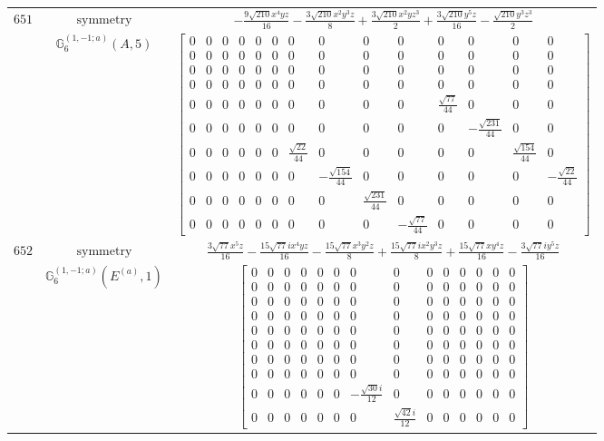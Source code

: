 \documentclass[fleqn,8pt,landscape]{jsarticle}
\begin{document}
\begin{longtable}{ccc}
$ 651 $ & $ \text{symmetry} $ & $ - \frac{9 \sqrt{210} x^{4} y z}{16} - \frac{3 \sqrt{210} x^{2} y^{3} z}{8} + \frac{3 \sqrt{210} x^{2} y z^{3}}{2} + \frac{3 \sqrt{210} y^{5} z}{16} - \frac{\sqrt{210} y^{3} z^{3}}{2} $ \\
$  $ & $ \mathbb{G}_{6}^{(1,-1;a)}(A,5) $ & $ \begin{bmatrix} 0 & 0 & 0 & 0 & 0 & 0 & 0 & 0 & 0 & 0 & 0 & 0 & 0 & 0 \\ 0 & 0 & 0 & 0 & 0 & 0 & 0 & 0 & 0 & 0 & 0 & 0 & 0 & 0 \\ 0 & 0 & 0 & 0 & 0 & 0 & 0 & 0 & 0 & 0 & 0 & 0 & 0 & 0 \\ 0 & 0 & 0 & 0 & 0 & 0 & 0 & 0 & 0 & 0 & 0 & 0 & 0 & 0 \\ 0 & 0 & 0 & 0 & 0 & 0 & 0 & 0 & 0 & 0 & \frac{\sqrt{77}}{44} & 0 & 0 & 0 \\ 0 & 0 & 0 & 0 & 0 & 0 & 0 & 0 & 0 & 0 & 0 & - \frac{\sqrt{231}}{44} & 0 & 0 \\ 0 & 0 & 0 & 0 & 0 & 0 & \frac{\sqrt{22}}{44} & 0 & 0 & 0 & 0 & 0 & \frac{\sqrt{154}}{44} & 0 \\ 0 & 0 & 0 & 0 & 0 & 0 & 0 & - \frac{\sqrt{154}}{44} & 0 & 0 & 0 & 0 & 0 & - \frac{\sqrt{22}}{44} \\ 0 & 0 & 0 & 0 & 0 & 0 & 0 & 0 & \frac{\sqrt{231}}{44} & 0 & 0 & 0 & 0 & 0 \\ 0 & 0 & 0 & 0 & 0 & 0 & 0 & 0 & 0 & - \frac{\sqrt{77}}{44} & 0 & 0 & 0 & 0 \end{bmatrix} $ \\ \hline
$ 652 $ & $ \text{symmetry} $ & $ \frac{3 \sqrt{77} x^{5} z}{16} - \frac{15 \sqrt{77} i x^{4} y z}{16} - \frac{15 \sqrt{77} x^{3} y^{2} z}{8} + \frac{15 \sqrt{77} i x^{2} y^{3} z}{8} + \frac{15 \sqrt{77} x y^{4} z}{16} - \frac{3 \sqrt{77} i y^{5} z}{16} $ \\
$  $ & $ \mathbb{G}_{6}^{(1,-1;a)}(E^{(a)},1) $ & $ \begin{bmatrix} 0 & 0 & 0 & 0 & 0 & 0 & 0 & 0 & 0 & 0 & 0 & 0 & 0 & 0 \\ 0 & 0 & 0 & 0 & 0 & 0 & 0 & 0 & 0 & 0 & 0 & 0 & 0 & 0 \\ 0 & 0 & 0 & 0 & 0 & 0 & 0 & 0 & 0 & 0 & 0 & 0 & 0 & 0 \\ 0 & 0 & 0 & 0 & 0 & 0 & 0 & 0 & 0 & 0 & 0 & 0 & 0 & 0 \\ 0 & 0 & 0 & 0 & 0 & 0 & 0 & 0 & 0 & 0 & 0 & 0 & 0 & 0 \\ 0 & 0 & 0 & 0 & 0 & 0 & 0 & 0 & 0 & 0 & 0 & 0 & 0 & 0 \\ 0 & 0 & 0 & 0 & 0 & 0 & 0 & 0 & 0 & 0 & 0 & 0 & 0 & 0 \\ 0 & 0 & 0 & 0 & 0 & 0 & 0 & 0 & 0 & 0 & 0 & 0 & 0 & 0 \\ 0 & 0 & 0 & 0 & 0 & 0 & - \frac{\sqrt{30} i}{12} & 0 & 0 & 0 & 0 & 0 & 0 & 0 \\ 0 & 0 & 0 & 0 & 0 & 0 & 0 & \frac{\sqrt{42} i}{12} & 0 & 0 & 0 & 0 & 0 & 0 \end{bmatrix} $ \\ \hline

\end{longtable}
\end{document}
